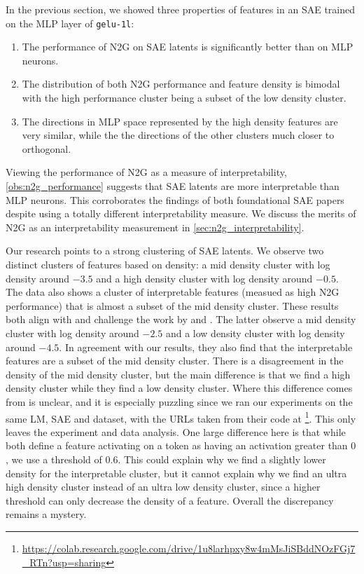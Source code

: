 In the previous section, we showed three properties of features in an \ac{SAE} trained on the \ac{MLP} layer of \texttt{gelu-1l}: 
\begin{enumerate}[ref={observation~\arabic*}]
    \item The performance of \ac{N2G} on \ac{SAE} latents is significantly better than on \ac{MLP} neurons.\label{obs:n2g_performance}
    \item The distribution of both \ac{N2G} performance and feature density is bimodal with the high performance cluster being a subset of the low density cluster.\label{obs:bimodal}
    \item The directions in \ac{MLP} space represented by the high density features are very similar, while the the directions of the other clusters much closer to orthogonal.\label{obs:directions}
\end{enumerate}
Viewing the performance of \ac{N2G} as a measure of interpretability, \ref{obs:n2g_performance} suggests that \ac{SAE} latents are more interpretable than \ac{MLP} neurons.
This corroborates the findings of both foundational \ac{SAE} papers \parencite{bricken_towards_2023}\parencite{cunningham_sparse_2023} despite using a totally different interpretability measure.
We discuss the merits of \ac{N2G} as an interpretability measurement in \autoref{sec:n2g_interpretability}.


Our research points to a strong clustering of SAE latents.
We observe two distinct clusters of features based on density: a mid density cluster with log density around $-3.5$ and a high density cluster with log density around $-0.5$.
The data also shows a cluster of interpretable features (measued as high \ac{N2G} performance) that is almost a subset of the mid density cluster.
These results both align with and challenge the work by \textcite{bricken_towards_2023} and \textcite{nanda_open_2023}.
The latter observe a mid density cluster with log density around $-2.5$ and a low density cluster with log density around $-4.5$.
In agreement with our results, they also find that the interpretable features are a subset of the mid density cluster.
There is a disagreement in the density of the mid density cluster, but the main difference is that we find a high density cluster while they find a low density cluster.
Where this difference comes from is unclear, and it is especially puzzling since we ran our experiments on the same \ac{LM}, \ac{SAE} and dataset, with the URLs taken from their code at \footnote{\url{https://colab.research.google.com/drive/1u8larhpxy8w4mMsJiSBddNOzFGj7_RTn?usp=sharing}}.
This only leaves the experiment and data analysis.
One large difference here is that while both  define a feature activating on a token as having an activation greater than $0$, we use a threshold of $0.6$.
This could explain why we find a slightly lower density for the interpretable cluster, but it cannot explain why we find an ultra high density cluster instead of an ultra low density cluster, since a higher threshold can only decrease the density of a feature.
Overall the discrepancy remains a mystery.

